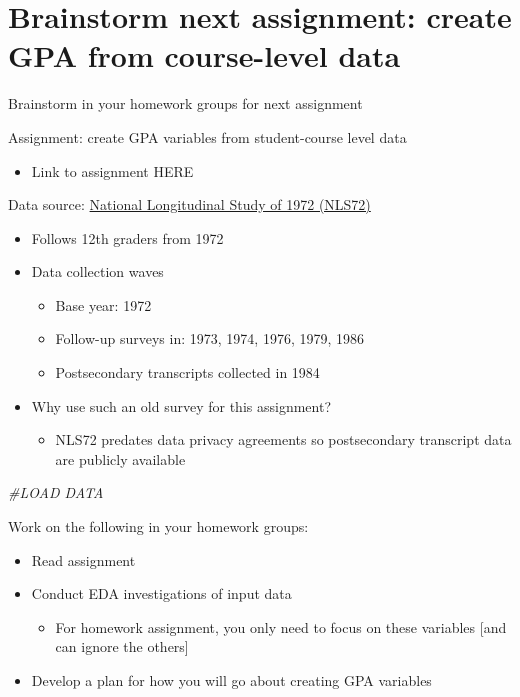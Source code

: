 \documentclass[8pt,ignorenonframetext,dvipsnames]{beamer}
\newenvironment{Shaded}{\begin{snugshade}}{\end{snugshade}}
\newcommand{\CommentTok}[1]{\textcolor[rgb]{0.56,0.35,0.01}{\textit{#1}}}
\providecommand{\tightlist}{%
  \setlength{\itemsep}{0pt}\setlength{\parskip}{0pt}}
\let\olditem\item
\renewcommand{\item}{%
  \olditem\vspace{4pt}
}
\begin{document}
\section{Brainstorm next assignment: create GPA from course-level
data}\label{brainstorm-next-assignment-create-gpa-from-course-level-data}

\begin{frame}[fragile]{Brainstorm in your homework groups for next
assignment}

Assignment: create GPA variables from student-course level data

\begin{itemize}
\tightlist
\item
  Link to assignment HERE
\end{itemize}

Data source: \href{https://nces.ed.gov/surveys/nls72/}{National
Longitudinal Study of 1972 (NLS72)}

\begin{itemize}
\tightlist
\item
  Follows 12th graders from 1972
\item
  Data collection waves

  \begin{itemize}
  \tightlist
  \item
    Base year: 1972
  \item
    Follow-up surveys in: 1973, 1974, 1976, 1979, 1986
  \item
    Postsecondary transcripts collected in 1984
  \end{itemize}
\item
  Why use such an old survey for this assignment?

  \begin{itemize}
  \tightlist
  \item
    NLS72 predates data privacy agreements so postsecondary transcript
    data are publicly available
  \end{itemize}
\end{itemize}

\begin{Shaded}
\begin{Highlighting}[]
\CommentTok{#LOAD DATA}
\end{Highlighting}
\end{Shaded}

Work on the following in your homework groups:

\begin{itemize}
\tightlist
\item
  Read assignment
\item
  Conduct EDA investigations of input data

  \begin{itemize}
  \tightlist
  \item
    For homework assignment, you only need to focus on these variables
    {[}and can ignore the others{]}
  \end{itemize}
\item
  Develop a plan for how you will go about creating GPA variables
\end{itemize}

\end{frame}
\end{document}
